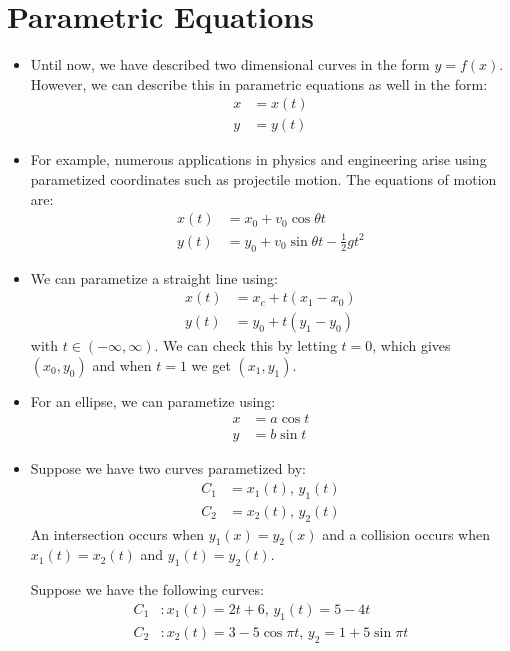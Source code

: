\section{Parametric Equations}
\begin{itemize}
    \item Until now, we have described two dimensional curves in the form $y=f(x)$. However, we can describe this in parametric equations as well in the form:
    \begin{align}
        x &= x(t) \\ 
        y &= y(t)
    \end{align}
    \item For example, numerous applications in physics and engineering arise using parametized coordinates such as projectile motion. The equations of motion are:
    \begin{align}
        x(t) &= x_0 + v_0 \cos\theta t \\ 
        y(t) &= y_0 + v_0 \sin\theta t - \frac{1}{2}g t^2
    \end{align}
    \item We can parametize a straight line using:
    \begin{align}
        x(t) &= x_c + t(x_1 - x_0) \\ 
        y(t) &= y_0 + t(y_1- y_0)
    \end{align}
    with $t \in (-\infty ,\infty)$. We can check this by letting $t=0$, which gives $(x_0,y_0)$ and when $t=1$ we get $(x_1, y_1)$.
    \item For an ellipse, we can parametize using:
    \begin{align}
        x &= a\cos t \\ 
        y &= b\sin t
    \end{align}
    \item Suppose we have two curves parametized by:
    \begin{align}
        C_1 &= x_1(t),\, y_1(t) \\ 
        C_2 &= x_2(t),\, y_2(t) 
    \end{align}
    An intersection occurs when $y_1(x)=y_2(x)$ and a collision occurs when $x_1(t) = x_2(t)$ and $y_1(t) = y_2(t)$.
    \begin{example}
        Suppose we have the following curves:
        \begin{align}
            C_1 &: x_1(t) = 2t+6,\, y_1(t) = 5 - 4t \\ 
            C_2 &: x_2(t) = 3-5\cos\pi t,\, y_2 = 1+5\sin \pi t

\end{align}
\end{example}
\end{itemize}
